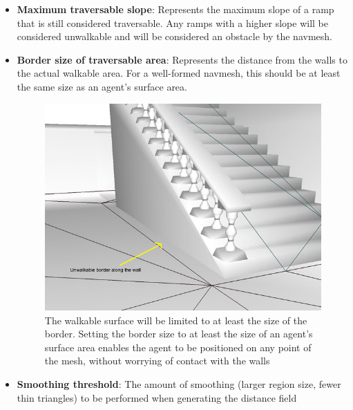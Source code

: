 \begin{itemize}
  \item\textbf{Maximum traversable slope}: Represents the maximum slope of a ramp that is still considered traversable. Any ramps with a higher slope will be considered unwalkable and will be considered an obstacle by the navmesh.
  
  \item\textbf{Border size of traversable area}: Represents the distance from the walls to the actual walkable area. For a well-formed navmesh, this should be at least the same size as an agent's surface area.
  
	\begin{figure}[H]
	\centering
	\includegraphics[width=1\textwidth]{../images/border_trav_size.png}
	\caption{The walkable surface will be limited to at least the size of the border. Setting the border size to at least the size of an agent's surface area enables the agent to be positioned on any point of the mesh, without worrying of contact with the walls}
\end{figure} 

  
  \item\textbf{Smoothing threshold}: The amount of smoothing (larger region size, fewer thin triangles) to be performed when generating the distance field
  
%



\end{itemize}
